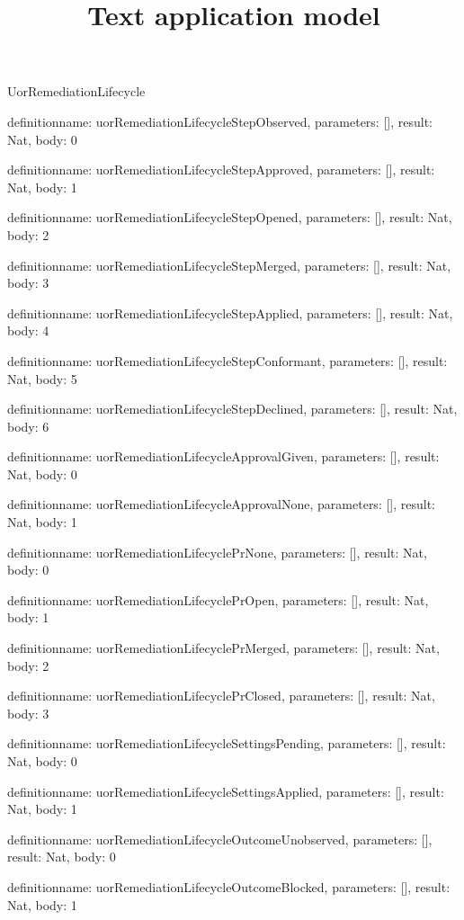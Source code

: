 \begin{lexlean}{UorRemediationLifecycle}
\title{Text application model}
\begin{semanticmodule}
definition{name: uorRemediationLifecycleStepObserved, parameters: [], result: Nat, body: 0}

definition{name: uorRemediationLifecycleStepApproved, parameters: [], result: Nat, body: 1}

definition{name: uorRemediationLifecycleStepOpened, parameters: [], result: Nat, body: 2}

definition{name: uorRemediationLifecycleStepMerged, parameters: [], result: Nat, body: 3}

definition{name: uorRemediationLifecycleStepApplied, parameters: [], result: Nat, body: 4}

definition{name: uorRemediationLifecycleStepConformant, parameters: [], result: Nat, body: 5}

definition{name: uorRemediationLifecycleStepDeclined, parameters: [], result: Nat, body: 6}

definition{name: uorRemediationLifecycleApprovalGiven, parameters: [], result: Nat, body: 0}

definition{name: uorRemediationLifecycleApprovalNone, parameters: [], result: Nat, body: 1}

definition{name: uorRemediationLifecyclePrNone, parameters: [], result: Nat, body: 0}

definition{name: uorRemediationLifecyclePrOpen, parameters: [], result: Nat, body: 1}

definition{name: uorRemediationLifecyclePrMerged, parameters: [], result: Nat, body: 2}

definition{name: uorRemediationLifecyclePrClosed, parameters: [], result: Nat, body: 3}

definition{name: uorRemediationLifecycleSettingsPending, parameters: [], result: Nat, body: 0}

definition{name: uorRemediationLifecycleSettingsApplied, parameters: [], result: Nat, body: 1}

definition{name: uorRemediationLifecycleOutcomeUnobserved, parameters: [], result: Nat, body: 0}

definition{name: uorRemediationLifecycleOutcomeBlocked, parameters: [], result: Nat, body: 1}


\end{semanticmodule}
\end{lexlean}
